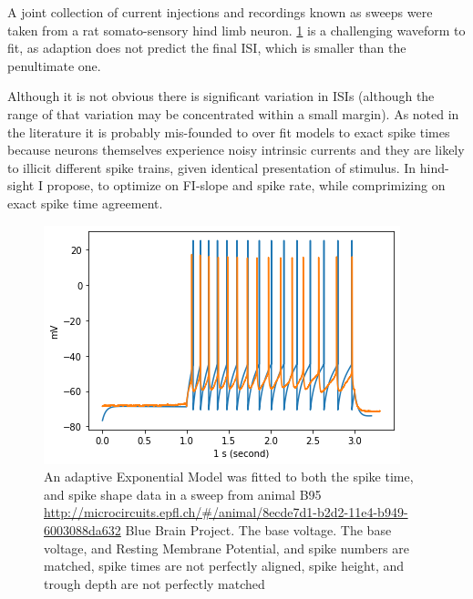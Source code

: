 
A joint collection of current injections and recordings known as sweeps were taken from a rat somato-sensory hind limb neuron.
\ref{fig:B95Adexp} is a challenging waveform to fit, as adaption does not predict the final ISI, which is smaller than the penultimate one. 

Although it is not obvious there is significant variation in ISIs (although the range of that variation may be concentrated within a small margin). As noted in the literature \cite{druckmann2007novel} it is probably mis-founded to over fit models to exact spike times because neurons themselves experience noisy intrinsic currents and they are likely to illicit different spike trains, given identical presentation of stimulus. In hind-sight I propose, to optimize on FI-slope and spike rate, while comprimizing on exact spike time agreement.

\begin{figure}
    \centering
    \includegraphics[scale=0.75]{figures/bbp_multispiking_fit.png}
    \caption{An adaptive Exponential Model was fitted to both the spike time, and spike shape data in a sweep from animal B95 \url{http://microcircuits.epfl.ch/#/animal/8ecde7d1-b2d2-11e4-b949-6003088da632} Blue Brain Project. The base voltage. The base voltage, and Resting Membrane Potential, and spike numbers are matched, spike times are not perfectly aligned, spike height, and trough depth are not perfectly matched}
    \label{fig:B95Adexp}
\end{figure}

